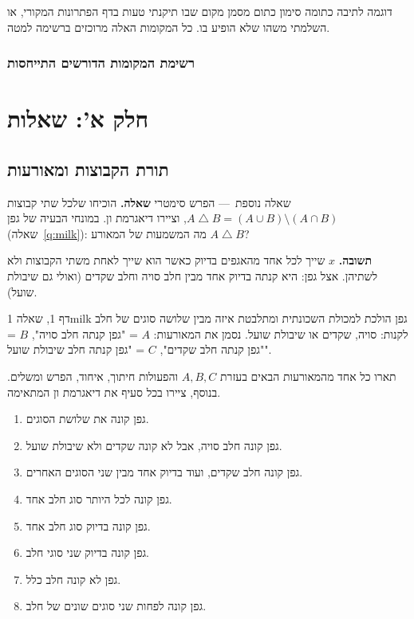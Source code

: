 \documentclass[11pt,a4paper]{report}
\makeatletter
\newif\ifshowtodos       \showtodostrue
\newcounter{todo}
\newcommand{\listoftodos}{\@starttoc{tdo}}
\newcommand{\symdiff}{\mathbin{\triangle}}
\newcommand{\dash}{{\rmfamily —}}
\makeatother
\begin{document}
\begin{attentiondemo}{דוגמה לתיבה כתומה}
סימון כתום מסמן מקום שבו תיקנתי טעות בדף הפתרונות המקורי, או השלמתי משהו שלא הופיע בו. כל המקומות האלה מרוכזים ברשימה למטה.
\end{attentiondemo}

\ifshowtodos
\section*{רשימת המקומות הדורשים התייחסות}
\listoftodos
\fi

\tableofcontents

\part*{חלק א': שאלות}

\chapter{תורת הקבוצות ומאורעות}
\begin{suggestion}{שאלה נוספת~\dash{} הפרש סימטרי}
\textbf{שאלה.} הוכיחו שלכל שתי קבוצות $A\symdiff B=(A\cup B)\setminus(A\cap B)$, וציירו דיאגרמת ון. במונחי הבעיה של גפן (שאלה~\ref{q:milk}): מה המשמעות של המאורע $A\symdiff B$?

\textbf{תשובה.} $x$ שייך לכל אחד מהאגפים בדיוק כאשר הוא שייך לאחת משתי הקבוצות ולא לשתיהן. אצל גפן: היא קנתה בדיוק אחד מבין חלב סויה וחלב שקדים (ואולי גם שיבולת שועל).
\end{suggestion}


\begin{exercise}{דף 1, שאלה 1}{milk}
גפן הולכת למכולת השכונתית ומתלבטת איזה מבין שלושה סוגים של חלב לקנות: סויה, שקדים או שיבולת שועל. נסמן את המאורעות:
$A$ = "גפן קנתה חלב סויה", $B$ = "גפן קנתה חלב שקדים", $C$ = "גפן קנתה חלב שיבולת שועל".

תארו כל אחד מהמאורעות הבאים בעזרת $A,B,C$ והפעולות חיתוך, איחוד, הפרש ומשלים. בנוסף, ציירו בכל סעיף את דיאגרמת ון המתאימה.
\begin{enumerate}[label=(\alph*)]
  \item גפן קונה את שלושת הסוגים.
  \item גפן קונה חלב סויה, אבל לא קונה שקדים ולא שיבולת שועל.
  \item גפן קונה חלב שקדים, ועוד בדיוק אחד מבין שני הסוגים האחרים.
  \item גפן קונה לכל היותר סוג חלב אחד.
  \item גפן קונה בדיוק סוג חלב אחד.
  \item גפן קונה בדיוק שני סוגי חלב.
  \item גפן לא קונה חלב כלל.
  \item גפן קונה לפחות שני סוגים שונים של חלב.
\end{enumerate}
\end{exercise}
\end{document}
